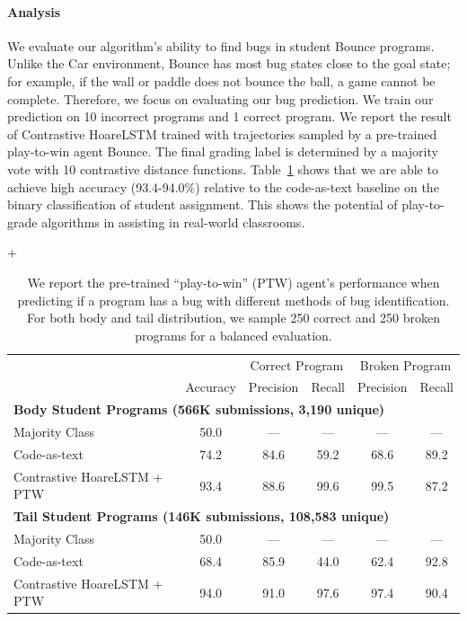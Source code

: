 \documentclass{article}
\newcommand{\EDIT}[1]{#1}%
\begin{document}
\paragraph{Analysis} We evaluate our algorithm's ability to find bugs in student Bounce programs. Unlike the Car environment, Bounce has most bug states close to the goal state; for example, if the wall or paddle does not bounce the ball, a game cannot be complete. Therefore, we focus on evaluating our bug prediction.
We \EDIT{train our prediction on} 10 incorrect programs and 1 correct program. 
We report the result of Contrastive HoareLSTM trained with trajectories sampled by a pre-trained play-to-win agent Bounce. The final grading label is determined by a majority vote with 10 contrastive distance functions. \EDIT{Table~\ref{tab:bounce-result} shows that we are able to achieve high accuracy (93.4-94.0\%) relative to the code-as-text baseline on the binary classification of student assignment.}
This shows the potential of play-to-grade algorithms in assisting in real-world classrooms. 



\begin{table}[]
\footnotesize+
\centering 
\begin{tabular}{@{}lccccc@{}}
\toprule
                                  &      & \multicolumn{2}{c}{Correct Program} & \multicolumn{2}{c}{Broken Program} \\ 
                                  & Accuracy & Precision              & Recall             & Precision             & Recall             \\ \midrule
\multicolumn{6}{l}{\textbf{Body Student Programs (566K submissions, 3,190 unique)}}        \\ \midrule
Majority Class & 50.0 & --- & --- & --- & ---  \\
Code-as-text & 74.2 & 84.6 & 59.2 & 68.6 & 89.2 \\
Contrastive HoareLSTM + PTW       &  93.4    &        88.6          &     99.6          &       99.5           &    87.2             \\ 
\midrule 
\multicolumn{6}{l}{\textbf{Tail Student Programs (146K submissions, 108,583 unique)}}        \\ \midrule
Majority Class & 50.0 & --- & --- & --- & ---  \\
Code-as-text & 68.4 & 85.9 & 44.0 & 62.4 & 92.8\\
Contrastive HoareLSTM + PTW       &   94.0   &         91.0         &     97.6            &       97.4           &    90.4             \\
\bottomrule
\end{tabular}
\vspace{0.3cm}
\caption{We report the pre-trained ``play-to-win'' (PTW) agent's performance \EDIT{when predicting if a program has a bug} with different methods of bug identification. For both body and tail distribution, we sample 250 correct and 250 broken programs for a balanced evaluation.}
\label{tab:bounce-result}
\end{table}
\end{document}
